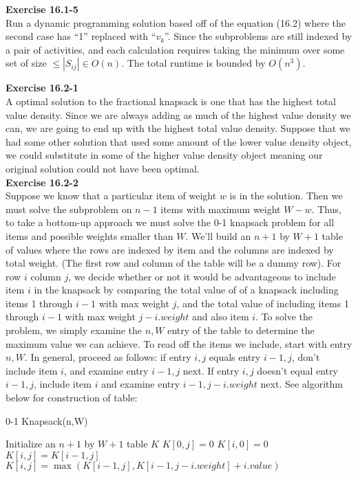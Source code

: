 \documentclass{article}
\begin{document}
\noindent\textbf{Exercise 16.1-5}\\

Run a dynamic programming solution based off of the equation (16.2) where the second case has ``1'' replaced with ``$v_k$''. Since the subproblems are still indexed by a pair of activities, and each calculation requires taking the minimum over some set of size $\le |S_{ij}| \in O(n)$. The total runtime is bounded by $O(n^3)$.

\noindent\textbf{Exercise 16.2-1}\\

A optimal solution to the fractional knapsack is one that has the highest total value density. Since we are always adding as much of the highest value density we can, we are going to end up with the highest total value density. Suppose that we had some other solution that used some amount of the lower value density object, we could substitute in some of the higher value density object meaning our original solution could not have been optimal.\\

\noindent\textbf{Exercise 16.2-2}\\

Suppose we know that a particular item of weight $w$ is in the solution.  Then we must solve the subproblem on $n-1$ items with maximum weight $W-w$.  Thus, to take a bottom-up approach we must solve the 0-1 knapsack problem for all items and possible weights smaller than $W$.  We'll build an $n+1$ by $W+1$ table of values where the rows are indexed by item and the columns are indexed by total weight.  (The first row and column of the table will be a dummy row).  For row $i$ column $j$, we decide whether or not it would be advantageous to include item $i$ in the knapsack by comparing the total value of of a knapsack including items 1 through $i-1$ with max weight $j$, and the total value of including items 1 through $i-1$ with max weight $j- i.weight$ and also item $i$.  To solve the problem, we simply examine the $n,W$ entry of the table to determine the maximum value we can achieve. To read off the items we include, start with entry $n,W$.  In general, proceed as follows: if entry $i,j$ equals entry $i-1,j$, don't include item $i$, and examine entry $i-1,j$ next.  If entry $i,j$ doesn't equal entry $i-1,j$, include item $i$ and examine entry $i-1,j-i.weight$ next.  See algorithm below for construction of table:

\begin{algorithm}
\caption{0-1 Knapsack(n,W)}
\begin{algorithmic}[1]
\State Initialize an $n+1$ by $W+1$ table $K$
	\State $K[0,j] = 0$
\EndFor
{}
	\State $K[i,0] = 0$
\EndFor
{}
			\State $K[i,j] = K[i-1,j]$
		\EndIf
		\State $K[i,j] = \max(K[i-1,j], K[i-1,j-i.weight] + i.value)$
	\EndFor
\EndFor
\end{algorithmic}
\end{algorithm}
\end{document}
